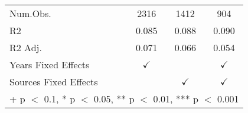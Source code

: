 \begin{table}
\begin{tabular}[t]{lccc}
\hspace{1em}Num.Obs. & 2316 & 1412 & 904\\
\hspace{1em}R2 & 0.085 & 0.088 & 0.090\\
\hspace{1em}R2 Adj. & 0.071 & 0.066 & 0.054\\
Years Fixed Effects & $\checkmark$ &  & $\checkmark$\\
Sources Fixed Effects &  & $\checkmark$ & $\checkmark$\\
\bottomrule
\multicolumn{4}{l}{\rule{0pt}{1em}+ p $<$ 0.1, * p $<$ 0.05, ** p $<$ 0.01, *** p $<$ 0.001}\\
\end{tabular}
\end{table}
